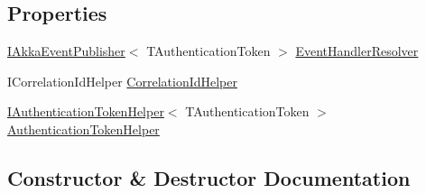 \subsection*{Properties}
\begin{DoxyCompactItemize}
\item 
\hyperlink{interfaceCqrs_1_1Akka_1_1Events_1_1IAkkaEventPublisher}{I\+Akka\+Event\+Publisher}$<$ T\+Authentication\+Token $>$ \hyperlink{classCqrs_1_1Akka_1_1Events_1_1AkkaEventBusProxy_1_1BusActor_ae7986841b1bb97368936c52655b72f96_ae7986841b1bb97368936c52655b72f96}{Event\+Handler\+Resolver}
\item 
I\+Correlation\+Id\+Helper \hyperlink{classCqrs_1_1Akka_1_1Events_1_1AkkaEventBusProxy_1_1BusActor_a4857b2d33de5de94001abf96710b1308_a4857b2d33de5de94001abf96710b1308}{Correlation\+Id\+Helper}
\item 
\hyperlink{interfaceCqrs_1_1Authentication_1_1IAuthenticationTokenHelper}{I\+Authentication\+Token\+Helper}$<$ T\+Authentication\+Token $>$ \hyperlink{classCqrs_1_1Akka_1_1Events_1_1AkkaEventBusProxy_1_1BusActor_a5a276908d994a77c84e12e73ff73a286_a5a276908d994a77c84e12e73ff73a286}{Authentication\+Token\+Helper}
\end{DoxyCompactItemize}


\subsection{Constructor \& Destructor Documentation}
\mbox{\label{classCqrs_1_1Akka_1_1Events_1_1AkkaEventBusProxy_1_1BusActor_aeb7cebaad75d810375d0adb82848974a_aeb7cebaad75d810375d0adb82848974a}} 

